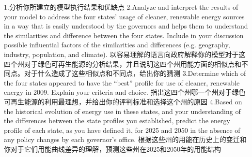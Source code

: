 1.分析你所建立的模型执行结果和优缺点
 2.Analyze and interpret the results of your model to address the four states’ usage of cleaner, renewable energy sources in a way that is easily understood by the governors and helps them to understand the similarities and difference between the four states. Include in your discussion possible influential factors of the similarities and differences (e.g. geography, industry, population, and climate).
 以容易理解的语言向政府解释你的模型对于这四个州对于绿色可再生能源的分析结果，并且说明这四个州用能方面的相似点和不同点。对于什么造成了这些相似点和不同点，给出你的猜测
 3.Determine which of the four states appeared to have the “best” profile for use of cleaner, renewable energy in 2009. Explain your criteria and choice.  
 指出这四个州哪一个州对于绿色可再生能源的利用最理想，并给出你的评判标准和选择这个州的原因
  4.Based on the historical evolution of energy use in these states, and your understanding of the differences between the state profiles you established, predict the energy profile of each state, as you have defined it, for 2025 and 2050 in the absence of any policy changes by each governor’s office.
根据这些州的用能在历史上的变迁和你对于它们用能曲线差异的理解，预测这些州在2025和2050年的用能结构
\subsection{}
\subsection{}
\subsection{}
\subsection{}